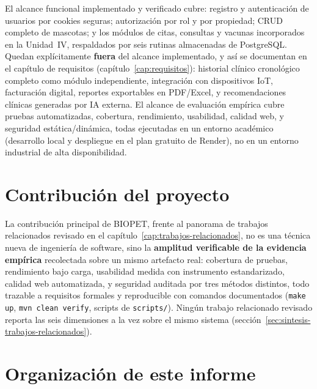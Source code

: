 El alcance funcional implementado y verificado cubre: registro y
autenticaci\'on de usuarios por cookies seguras; autorizaci\'on por rol y
por propiedad; CRUD completo de mascotas; y los m\'odulos de citas,
consultas y vacunas incorporados en la Unidad~IV, respaldados por seis
rutinas almacenadas de PostgreSQL. Quedan expl\'icitamente \textbf{fuera}
del alcance implementado, y as\'i se documentan en el cap\'itulo de
requisitos (cap\'itulo~\ref{cap:requisitos}): historial cl\'inico
cronol\'ogico completo como m\'odulo independiente, integraci\'on con
dispositivos IoT, facturaci\'on digital, reportes exportables en PDF/Excel,
y recomendaciones cl\'inicas generadas por IA externa. El alcance de
evaluaci\'on emp\'irica cubre pruebas automatizadas, cobertura, rendimiento,
usabilidad, calidad web, y seguridad est\'atica/din\'amica, todas ejecutadas
en un entorno acad\'emico (desarrollo local y despliegue en el plan gratuito
de Render), no en un entorno industrial de alta disponibilidad.

\section{Contribuci\'on del proyecto}

La contribuci\'on principal de BIOPET, frente al panorama de trabajos
relacionados revisado en el cap\'itulo~\ref{cap:trabajos-relacionados}, no
es una t\'ecnica nueva de ingenier\'ia de software, sino la
\textbf{amplitud verificable de la evidencia emp\'irica} recolectada sobre
un mismo artefacto real: cobertura de pruebas, rendimiento bajo carga,
usabilidad medida con instrumento estandarizado, calidad web automatizada, y
seguridad auditada por tres m\'etodos distintos, todo trazable a
requisitos formales y reproducible con comandos documentados
(\texttt{make up}, \texttt{mvn clean verify}, scripts de
\texttt{scripts/}). Ning\'un trabajo relacionado revisado reporta las seis
dimensiones a la vez sobre el mismo sistema (secci\'on~\ref{sec:sintesis-trabajos-relacionados}).

\section{Organizaci\'on de este informe}

